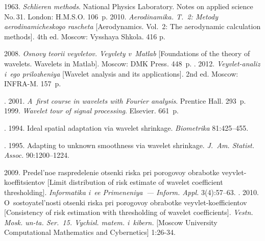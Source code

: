 


\pagebreak





  \begin{multicols}{2}

\renewcommand{\bibname}{\protect\rmfamily References}

{\small\frenchspacing
 {%
 \begin{thebibliography}{99}

 1963.
\textit{Schlieren methods}.
    National Physics Laboratory. Notes on applied science No.\,31.
    London: H.M.S.O. 106~p.
 2010. \textit{Aerodinamika. T.~2: Metody aerodinamicheskogo rascheta}
[Aerodynamics. Vol.~2: The aerodynamic calculation methods].  4th ed. 
Moscow: Vysshaya Shkola. 416 p.

 2008. 
\textit{Osnovy teorii veyvletov. Veyvlety v~Matlab} 
[Foundations of the theory of wavelets. Wavelets in Matlab]. Moscow: DMK Press. 448~p.
. 2012.
\textit{Veyvlet-analiz i~ego prilozheniya} [Wavelet analysis and its applications]. 
2nd ed. Moscow: INFRA-M. 157~p.

. 2001. 
\textit{A~first course in wavelets with Fourier analysis}. Prentice Hall. 293~p.
 1999. 
\textit{Wavelet tour of signal processing}. Elsevier. 661~p.

. 1994.  
Ideal spatial adaptation via wavelet shrinkage. \textit{Biometrika} 81:425--455.

. 1995. 
Adapting to unknown smoothness via wavelet shrinkage. 
\textit{J.~Am. Statist. Assoc.} 90:1200--1224.


 2009. 
Predel'noe raspredelenie otsenki riska pri porogovoy obrabotke veyvlet-koeffitsientov 
[Limit distribution of risk estimate of wavelet coefficient thresholding].
\textit{Informatika i~ee Primeneniya~--- Inform. Appl.} 3(4):57--63.
. 
2010. O~sostoyatel'nosti otsenki riska pri porogovoy obrabotke 
veyvlet-koefficientov [Consistency of risk estimation with thresholding 
of wavelet coefficients]. \textit{Vestn. Mosk. un-ta. Ser.~15. 
Vychisl. matem. i~kibern.} [Moscow University Computational Mathematics and Cybernetics]
1:26-34.


\end{thebibliography}}}
\end{multicols}
